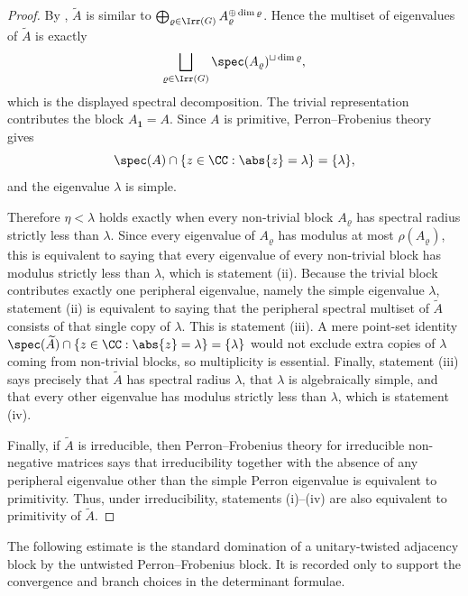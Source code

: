 \begin{proof}
  By
  ,
  \(\widetilde A\) is similar to
  \(\bigoplus_{\varrho\in\Irr(G)}A_\varrho^{\oplus\dim\varrho}\). Hence
  the multiset of eigenvalues of \(\widetilde A\) is exactly
  \[
    \bigsqcup_{\varrho\in\Irr(G)}
      \spec(A_\varrho)^{\sqcup \dim\varrho},
  \]
  which is the displayed spectral decomposition. The trivial
  representation contributes the block \(A_{\mathbf 1}=A\). Since \(A\)
  is primitive, Perron--Frobenius theory gives
  \[
    \spec(A)\cap\{z\in\CC:\abs{z}=\lambda\}=\{\lambda\},
  \]
  and the eigenvalue \(\lambda\) is simple.

  Therefore \(\eta<\lambda\) holds exactly when every non-trivial block
  \(A_\varrho\) has spectral radius strictly less than \(\lambda\).
  Since every eigenvalue of \(A_\varrho\) has modulus at most
  \(\rho(A_\varrho)\), this is equivalent to saying that every
  eigenvalue of every non-trivial block has modulus strictly less than
  \(\lambda\), which is statement \rm(ii). Because the trivial block
  contributes exactly one peripheral eigenvalue, namely the simple
  eigenvalue \(\lambda\), statement \rm(ii) is equivalent to saying
  that the peripheral spectral multiset of \(\widetilde A\) consists of
  that single copy of \(\lambda\). This is statement \rm(iii). A mere
  point-set identity
  \(\spec(\widetilde A)\cap\{z\in\CC:\abs{z}=\lambda\}=\{\lambda\}\)
  would not exclude extra copies of \(\lambda\) coming from
  non-trivial blocks, so multiplicity is essential. Finally,
  statement \rm(iii) says precisely that \(\widetilde A\) has spectral
  radius \(\lambda\), that \(\lambda\) is algebraically simple, and
  that every other eigenvalue has modulus strictly less than
  \(\lambda\), which is statement \rm(iv).

  Finally, if \(\widetilde A\) is irreducible, then Perron--Frobenius
  theory for irreducible non-negative matrices says that irreducibility
  together with the absence of any peripheral eigenvalue other than the
  simple Perron eigenvalue is equivalent to primitivity. Thus, under
  irreducibility, statements \rm(i)--\rm(iv) are also equivalent to
  primitivity of \(\widetilde A\).
\end{proof}

The following estimate is the standard domination of a unitary-twisted
adjacency block by the untwisted Perron--Frobenius block.  It is recorded only
to support the convergence and branch choices in the determinant formulae.


